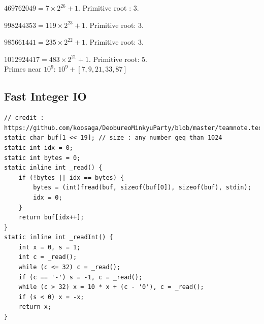 \documentclass[landscape, 8pt, a4paper, oneside, twocolumn]{extarticle}
\begin{document}
$469762049 = 7 \times 2^{26} + 1$. Primitive root : $3$.

$998244353 = 119 \times 2^{23} + 1$. Primitive root: $3$.

$985661441 = 235 \times 2^{22} + 1$. Primitive root: $3$.

$1012924417 = 483 \times 2^{21} + 1$. Primitive root: $5$.
\\
Primes near $10^9$:
$10^9 + [7, 9, 21, 33, 87]$

\subsection {Fast Integer IO}
\begin{verbatim}
// credit : https://github.com/koosaga/DeobureoMinkyuParty/blob/master/teamnote.tex
static char buf[1 << 19]; // size : any number geq than 1024 
static int idx = 0;
static int bytes = 0;
static inline int _read() {
    if (!bytes || idx == bytes) {
        bytes = (int)fread(buf, sizeof(buf[0]), sizeof(buf), stdin);
        idx = 0;
    }
    return buf[idx++];
}
static inline int _readInt() {
    int x = 0, s = 1;
    int c = _read();
    while (c <= 32) c = _read();
    if (c == '-') s = -1, c = _read();
    while (c > 32) x = 10 * x + (c - '0'), c = _read();
    if (s < 0) x = -x;
    return x;
}
\end{verbatim}
\end{document}
